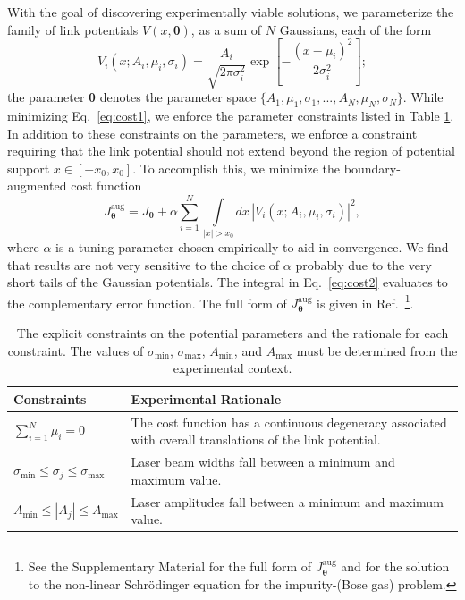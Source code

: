 \documentclass[twocolumn,amsmath,amssymb,showpacs,prl,superscriptaddress,aps]{revtex4-1}
\begin{document}
With the goal of discovering experimentally viable solutions, we parameterize the family of link potentials $V(x, \bm{\theta})$, as a sum of $N$ Gaussians, each of the form
\begin{equation}\label{eq:V-param}
V_i(x; A_i, \mu_i, \sigma_i) = \frac{A_i}{\sqrt{2\pi\sigma_i^2}}\exp\left[{-\frac{(x-\mu_i)^2}{2\sigma_i^2}}\right];
\end{equation}
the parameter $\bm{\theta}$ denotes the parameter space $\{A_1, \mu_1, \sigma_1,...,A_N, \mu_N, \sigma_N\}$. While minimizing Eq.~\eqref{eq:cost1}, we enforce the parameter constraints listed in Table \ref{tab:constraints}. In addition to these constraints on the parameters, we enforce a constraint requiring that the link potential should not extend beyond the region of potential support $x\in[-x_0,x_0]$. 
To accomplish this, we minimize the boundary-augmented cost function
\begin{equation}\label{eq:cost2}
  J_{\bm{\theta}}^{\mathrm{aug}} = J_{\bm{\theta}} + \alpha \sum_{i=1}^N\int\limits_{|x|>x_0}dx\,|V_i(x; A_i,\mu_i,\sigma_i)|^2,
\end{equation}
where $\alpha$ is a tuning parameter chosen empirically to aid in convergence. We find that results are not very sensitive to the choice of $\alpha$ probably due to the very short tails of the Gaussian potentials. The integral in Eq.~\eqref{eq:cost2} evaluates to the complementary error function. The full form of $J_{\bm{\theta}}^{\mathrm{aug}}$ is given in Ref.~\footnote{See the Supplementary Material for the full form of $J_{\bm{\theta}}^{\mathrm{aug}}$ and 
for the solution to the non-linear Schr{\"o}dinger equation for the impurity-(Bose gas) problem.}.

\begin{table}[t]
  \renewcommand*{\arraystretch}{1.4}
  \begin{tabular}{m{3cm}|m{5.5cm}}
    Constraints & Experimental Rationale \\
    \hline\hline
    $\sum_{i=1}^{N}\mu_i = 0$ & The cost function has a continuous degeneracy associated with overall translations of the link potential. \\
    \hline
    $\sigma_{\mathrm{min}} \leq \sigma_j \leq \sigma_{\mathrm{max}} $ & Laser beam widths fall between a minimum and maximum value.\\
    \hline
    $A_{\mathrm{min}} \leq |A_j| \leq A_{\mathrm{max}}$ & Laser amplitudes fall between a minimum and maximum value.
  \end{tabular}
  \caption{The explicit constraints on the potential parameters and the rationale for each constraint. The values of $\sigma_{\mathrm{min}}$, $\sigma_{\mathrm{max}}$, $A_{\mathrm{min}}$, and $A_{\mathrm{max}}$ must be determined from the experimental context.}
  \label{tab:constraints}
\end{table}
\end{document}
